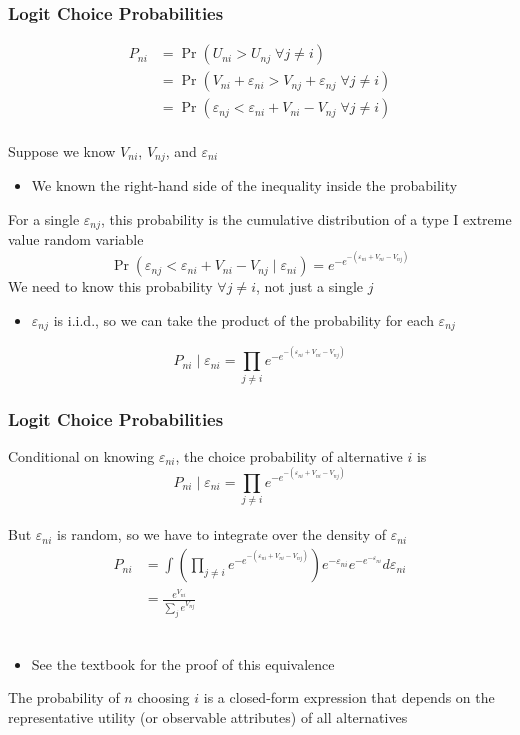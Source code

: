 \documentclass{beamer}\usepackage[]{graphicx}\usepackage[]{color}
\begin{document}
\begin{frame}\frametitle{Logit Choice Probabilities}
	\vspace{-4ex}
    \begin{align*}
    	P_{ni} & = \Pr(U_{ni} > U_{nj} \; \forall j \neq i) \\
    	& = \Pr(V_{ni} + \varepsilon_{ni} > V_{nj} + \varepsilon_{nj} \; \forall j \neq i) \\
    	& = \Pr(\varepsilon_{nj} < \varepsilon_{ni} + V_{ni} - V_{nj} \; \forall j \neq i)
    \end{align*} \\
    \vspace{1ex}
    Suppose we know $V_{ni}$, $V_{nj}$, and $\varepsilon_{ni}$
    \begin{itemize}
        \item We known the right-hand side of the inequality inside the probability
    \end{itemize}
    \vspace{2ex}
    For a single $\varepsilon_{nj}$, this probability is the cumulative distribution of a type I extreme value random variable
    $$\Pr(\varepsilon_{nj} < \varepsilon_{ni} + V_{ni} - V_{nj} \mid \varepsilon_{ni}) = e^{-e^{-(\varepsilon_{ni} + V_{ni} - V_{nj})}}$$
    We need to know this probability $\forall j \neq i$, not just a single $j$
    \begin{itemize}
        \item $\varepsilon_{nj}$ is i.i.d., so we can take the product of the probability for each $\varepsilon_{nj}$
    \end{itemize}
    $$P_{ni} \mid \varepsilon_{ni} = \prod_{j \neq i} e^{-e^{-(\varepsilon_{ni} + V_{ni} - V_{nj})}}$$
\end{frame}

\begin{frame}\frametitle{Logit Choice Probabilities}
    Conditional on knowing $\varepsilon_{ni}$, the choice probability of alternative $i$ is
    $$P_{ni} \mid \varepsilon_{ni} = \prod_{j \neq i} e^{-e^{-(\varepsilon_{ni} + V_{ni} - V_{nj})}}$$ \\
    But $\varepsilon_{ni}$ is random, so we have to integrate over the density of $\varepsilon_{ni}$
    \begin{align*}
        P_{ni} & = \int \left( \prod_{j \neq i} e^{-e^{-(\varepsilon_{ni} + V_{ni} - V_{nj})}} \right) e^{-\varepsilon_{ni}} e^{-e^{-\varepsilon_{ni}}} d\varepsilon_{ni} \\
        & = \frac{e^{V_{ni}}}{\sum_j e^{V_{nj}}}
    \end{align*} \\
    \vspace{-1ex}
    \begin{itemize}
        \item See the textbook for the proof of this equivalence
    \end{itemize}
    \vspace{2ex}
    The probability of $n$ choosing $i$ is a closed-form expression that depends on the representative utility (or observable attributes) of all alternatives
\end{frame}
\end{document}

